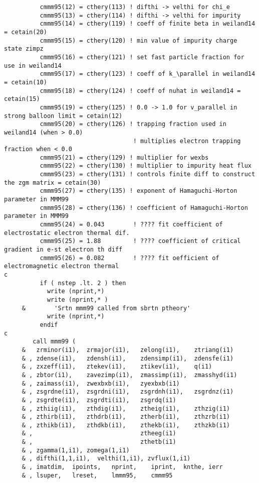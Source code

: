 \begin{verbatim}
          cmmm95(12) = cthery(113) ! difthi -> velthi for chi_e
          cmmm95(13) = cthery(114) ! difthi -> velthi for impurity
          cmmm95(14) = cthery(119) ! coeff of finite beta in weiland14 = cetain(20)
          cmmm95(15) = cthery(120) ! min value of impurity charge state zimpz
          cmmm95(16) = cthery(121) ! set fast particle fraction for use in weiland14
          cmmm95(17) = cthery(123) ! coeff of k_\parallel in weiland14 = cetain(10)
          cmmm95(18) = cthery(124) ! coeff of nuhat in weiland14 = cetain(15)
          cmmm95(19) = cthery(125) ! 0.0 -> 1.0 for v_parallel in strong balloon limit = cetain(12)
          cmmm95(20) = cthery(126) ! trapping fraction used in weiland14 (when > 0.0)
                                    ! multiplies electron trapping fraction when < 0.0
          cmmm95(21) = cthery(129) ! multiplier for wexbs 
          cmmm95(22) = cthery(130) ! multiplier to impurity heat flux
          cmmm95(23) = cthery(131) ! controls finite diff to construct the zgm matrix = cetain(30)
          cmmm95(27) = cthery(135) ! exponent of Hamaguchi-Horton parameter in MMM99
          cmmm95(28) = cthery(136) ! coefficient of Hamaguchi-Horton parameter in MMM99
          cmmm95(24) = 0.043        ! ???? fit coefficient of electrostatic electron thermal dif.
          cmmm95(25) = 1.88         ! ???? coefficient of critical gradient in e-st electron th diff
          cmmm95(26) = 0.082        ! ???? fit oefficient of electromagnetic electron thermal 
c
          if ( nstep .lt. 2 ) then
            write (nprint,*)
            write (nprint,* )
     &        'Srtn mmm99 called from sbrtn ptheory'
            write (nprint,*)
          endif
c
        call mmm99 (
     &   zrminor(i1),  zrmajor(i1),   zelong(i1),    ztriang(i1)
     & , zdense(i1),   zdensh(i1),    zdensimp(i1),  zdensfe(i1)
     & , zxzeff(i1),   ztekev(i1),    ztikev(i1),    q(i1)
     & , zbtor(i1),    zavezimp(i1),  zmassimp(i1),  zmasshyd(i1)
     & , zaimass(i1),  zwexbxb(i1),   zyexbxb(i1)
     & , zsgrdne(i1),  zsgrdni(i1),   zsgrdnh(i1),   zsgrdnz(i1)
     & , zsgrdte(i1),  zsgrdti(i1),   zsgrdq(i1)
     & , zthiig(i1),   zthdig(i1),    ztheig(i1),    zthzig(i1)
     & , zthirb(i1),   zthdrb(i1),    ztherb(i1),    zthzrb(i1)
     & , zthikb(i1),   zthdkb(i1),    zthekb(i1),    zthzkb(i1)
     & ,                              ztheeg(i1)
     & ,                              zthetb(i1)
     & , zgamma(1,i1), zomega(1,i1)
     & , difthi(1,1,i1),  velthi(1,i1), zvflux(1,i1)
     & , imatdim,  ipoints,   nprint,    iprint,  knthe, ierr
     & , lsuper,   lreset,    lmmm95,    cmmm95

\end{verbatim}
